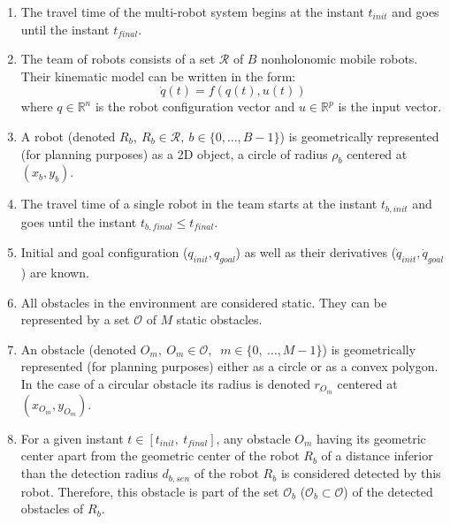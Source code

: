 \begin{enumerate}

    \item The travel time of the multi-robot system begins at
    the instant $t_{init}$ and goes until the instant $t_{final}$.

    \item The team of robots consists of a set $\mathcal{R}$ of $B$
    nonholonomic mobile robots. Their kinematic model can be written in the form:
    $$
    \dot{q}(t) = f(q(t),u(t))
    $$
    where $q \in \mathds{R}^n$ is the robot configuration vector and $u \in \mathds{R}^p$ is the input vector.    

    \item A robot (denoted $R_b,\ R_b \in \mathcal{R},\ b \in \{0,\dots,B-1\}$) 
    is 
    geometrically represented (for planning purposes) as a 2D object, a circle of
    radius $\rho_b$ centered at  $(x_b, y_b)$.
    
    \item The travel time of a single robot in the team starts at
    the instant $t_{b,init}$ and goes until the instant $t_{b,final} \leq 
    t_{final}$.
    
    \item Initial and goal configuration ($q_{init}, q_{goal}$) as well as their
    derivatives ($\dot{q}_{init}, \dot{q}_{goal}$) are known.
        
    \item All obstacles in the environment are considered static. They can be
    represented by a set $\mathcal{O}$ of $M$ static obstacles.
    
    \item An obstacle (denoted $O_m,\ $\mbox{$O_m \in \mathcal{O}$}$,\ $
    \mbox{$m \in \{0,\ \dots, M-1\}$}) is geometrically represented
    (for planning purposes) either as
    a circle or as a convex polygon. In the case of a circular obstacle its
    radius is denoted $r_{O_m}$ centered at $(x_{O_m},y_{O_m})$.
    
    \item For a given instant $t \in [t_{init},\ t_{final}]$, any obstacle
    $O_m$ having its geometric center apart from the geometric center of the
    robot $R_b$ of a distance inferior than the detection radius $d_{b,sen}$
    of the robot $R_b$ is considered detected by this robot.
    Therefore, this obstacle is part of the set $\mathcal{O}_b$
    ($\mathcal{O}_b \subset \mathcal{O}$) of the detected obstacles of $R_b$.
    

\end{enumerate}
